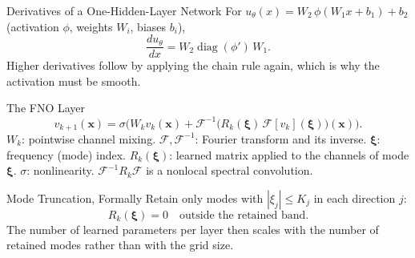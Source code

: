 \documentclass{ntuabeamer}
\begin{document}
\begin{frame}{Derivatives of a One-Hidden-Layer Network}
  For \(u_\theta(x)=W_2\,\phi(W_1x+b_1)+b_2\) (activation \(\phi\), weights \(W_i\), biases \(b_i\)),
  \[
    \frac{du_\theta}{dx}=W_2\operatorname{diag}(\phi')\,W_1 .
  \]
  Higher derivatives follow by applying the chain rule again, which is why the activation must be smooth.
\end{frame}

\begin{frame}{The FNO Layer}
  \[
    v_{k+1}(\mathbf x)=\sigma\!\Big(W_kv_k(\mathbf x)+\mathcal F^{-1}\big(R_k(\boldsymbol\xi)\,\mathcal F[v_k](\boldsymbol\xi)\big)(\mathbf x)\Big).
  \]
  \(W_k\): pointwise channel mixing. \(\mathcal F,\mathcal F^{-1}\): Fourier transform and its inverse. \(\boldsymbol\xi\): frequency (mode) index.
  \(R_k(\boldsymbol\xi)\): learned matrix applied to the channels of mode \(\boldsymbol\xi\). \(\sigma\): nonlinearity.
  \(\mathcal F^{-1}R_k\mathcal F\) is a nonlocal spectral convolution.
\end{frame}

\begin{frame}{Mode Truncation, Formally}
  Retain only modes with \(|\xi_j|\le K_j\) in each direction \(j\):
  \[
    R_k(\boldsymbol\xi)=0\quad\text{outside the retained band}.
  \]
  The number of learned parameters per layer then scales with the number of retained modes rather than with the grid size.
\end{frame}
\end{document}
